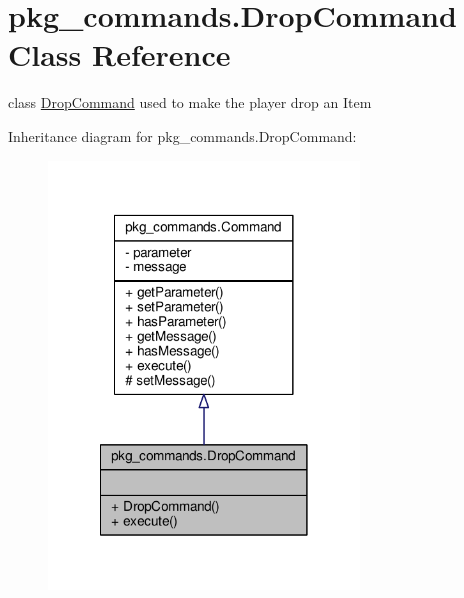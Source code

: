 \hypertarget{classpkg__commands_1_1DropCommand}{\section{pkg\-\_\-commands.\-Drop\-Command Class Reference}
\label{classpkg__commands_1_1DropCommand}
}


class \hyperlink{classpkg__commands_1_1DropCommand}{Drop\-Command} used to make the player drop an Item  




Inheritance diagram for pkg\-\_\-commands.\-Drop\-Command\-:\nopagebreak
\begin{figure}[H]
\begin{center}
\leavevmode
\includegraphics[width=234pt]{classpkg__commands_1_1DropCommand__inherit__graph}
\end{center}
\end{figure}


